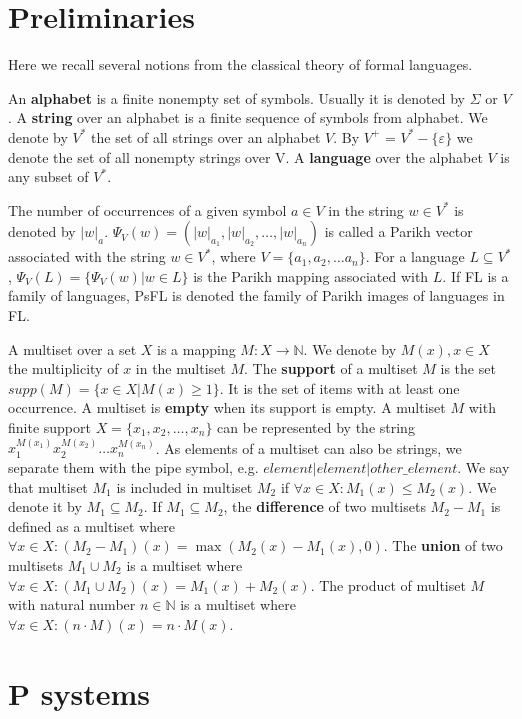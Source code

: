 \documentclass[llncs,submission,copyright,creativecommons]{../lib/lncs/llncs}
\def\eps{\varepsilon}
\begin{document}
\section{Preliminaries}
\label{sec:preliminaries}

Here we recall several notions from the classical theory of formal languages.

An {\bf alphabet} is a finite nonempty set of symbols. Usually it is denoted by $\Sigma$ or $V$. A {\bf string} over an alphabet is a finite sequence of symbols from alphabet. We denote by $V^*$ the set of all strings over an alphabet $V$. By $V^+$ = $V^* - \{\eps\}$ we denote the set of all nonempty strings over V. A {\bf language} over the alphabet $V$ is any subset of $V^*$.

The number of occurrences of a given symbol $a\in V$ in the string $w\in V^*$ is denoted by $|w|_a$. $\Psi_V(w)=(|w|_{a_1},|w|_{a_2},\dots,|w|_{a_n})$ is called a Parikh vector associated with the string $w\in V^*$, where $V=\{a_1,a_2,\dots a_n\}$. For a language $L\subseteq V^*$, $\Psi_V(L)=\{\Psi_V(w)|w\in L\}$ is the Parikh mapping associated with $L$. If FL is a family of languages, PsFL is denoted the family of Parikh images of languages in FL.

A multiset over a set $X$ is a mapping $M: X\rightarrow \mathbb N$.
We denote by $M(x), x\in X$ the multiplicity of $x$ in the multiset $M$.
The {\bf support} of a multiset $M$ is the set $supp(M)=\{x\in X|M(x)\geq 1\}$.
It is the set of items with at least one occurrence.
A multiset is {\bf empty} when its support is empty.
A multiset $M$ with finite support $X = \{x_1, x_2, \dots, x_n\}$ can be represented by the string $x_1^{M(x_1)}x_2^{M(x_2)}\dots x_n^{M(x_n)}$.
As elements of a multiset can also be strings, we separate them with the pipe symbol, e.g. $element|element|other\_element$.
We say that multiset $M_1$ is included in multiset $M_2$ if $\forall x \in X: M_1(x)\leq M_2(x)$.
We denote it by $M_1\subseteq M_2$.
If $M_1\subseteq M_2$, the {\bf difference} of two multisets $M_2-M_1$ is defined as a multiset where $\forall x \in X: (M_2-M_1)(x)=\max(M_2(x)-M_1(x),0)$.
The {\bf union} of two multisets $M_1\cup M_2$ is a multiset where $\forall x \in X: (M_1\cup M_2)(x)=M_1(x)+M_2(x)$.
The product of multiset $M$ with natural number $n\in \mathbb N$ is a multiset where $\forall x \in X: (n\cdot M)(x)=n\cdot M(x)$.
  
\section{P systems}
\label{sec:p systems}
\end{document}
